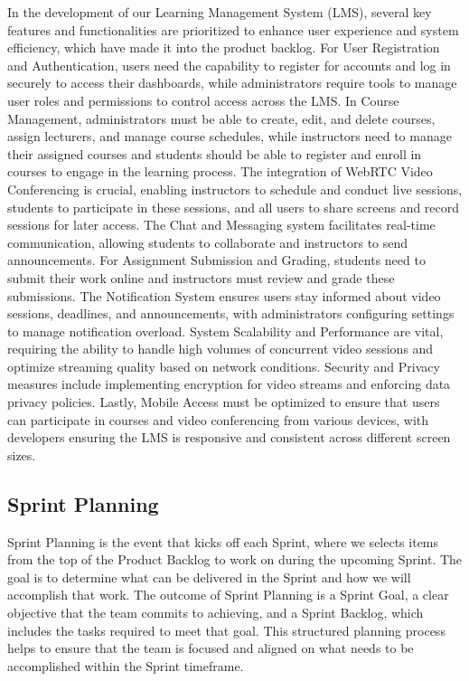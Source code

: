 \documentclass[a4paper,12pt]{article}  %
\begin{document}
In the development of our Learning Management System (LMS), several key
features and functionalities are prioritized to enhance user experience and
system efficiency, which have made it into the product backlog. For User
Registration and Authentication, users need the capability to register for
accounts and log in securely to access their dashboards, while administrators
require tools to manage user roles and permissions to control access across the
LMS. In Course Management, administrators must be able to create, edit, and
delete courses, assign lecturers, and manage course schedules, while
instructors need to manage their assigned courses and students should be able
to register and enroll in courses to engage in the learning process. The
integration of WebRTC Video Conferencing is crucial, enabling instructors to
schedule and conduct live sessions, students to participate in these sessions,
and all users to share screens and record sessions for later access. The Chat
and Messaging system facilitates real-time communication, allowing students to
collaborate and instructors to send announcements. For Assignment Submission
and Grading, students need to submit their work online and instructors must
review and grade these submissions. The Notification System ensures users stay
informed about video sessions, deadlines, and announcements, with
administrators configuring settings to manage notification overload. System
Scalability and Performance are vital, requiring the ability to handle high
volumes of concurrent video sessions and optimize streaming quality based on
network conditions. Security and Privacy measures include implementing
encryption for video streams and enforcing data privacy policies. Lastly,
Mobile Access must be optimized to ensure that users can participate in courses
and video conferencing from various devices, with developers ensuring the LMS
is responsive and consistent across different screen sizes.\\

\subsection{Sprint Planning}
Sprint Planning is the event that kicks off each Sprint, where we selects items
from the top of the Product Backlog to work on during the upcoming Sprint. The
goal is to determine what can be delivered in the Sprint and how we will
accomplish that work. The outcome of Sprint Planning is a Sprint Goal, a clear
objective that the team commits to achieving, and a Sprint Backlog, which
includes the tasks required to meet that goal. This structured planning process
helps to ensure that the team is focused and aligned on what needs to be
accomplished within the Sprint
timeframe.\cite{beck2001agile}\cite{beedle2001agile}\cite{schwaber2020scrum}\\
\end{document}
